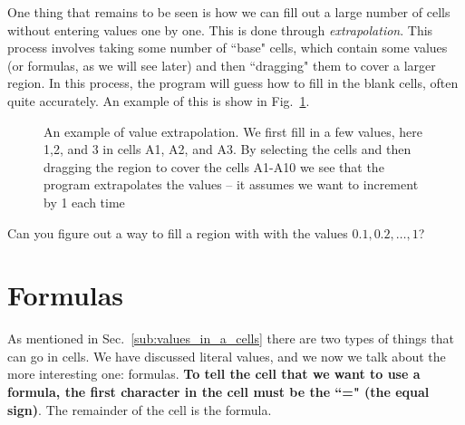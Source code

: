 \documentclass[10pt]{article}
\begin{document}
One thing that remains to be seen is how we can fill out a large number of cells without entering values one by one. This is done through \textit{extrapolation}. This process involves taking some number of ``base" cells, which contain some values (or formulas, as we will see later) and then ``dragging" them to cover a larger region. In this process, the program will guess how to fill in the blank cells, often quite accurately. An example of this is show in Fig.~\ref{fig:extrapolation}.


\begin{figure}[htpb]
	\centering
	\begin{minipage}{0.5\textwidth}
	\begin{sheetpic}
	\end{sheetpic}
	\end{minipage}
	\begin{minipage}{0.3\textwidth}
	\begin{sheetpic}
		\etab[10]{A-B}	
		\fillCol{A}{1}{10}{\row}{c}
		\multiSelec{A-1}{A-10}
	\end{sheetpic}
\end{minipage}
\caption{An example of value extrapolation. We first fill in a few values, here 1,2, and 3 in cells A1, A2, and A3. By selecting the cells and then dragging the region to cover the cells A1-A10 we see that the program extrapolates the values -- it assumes we want to increment by 1 each time}%
	\label{fig:extrapolation}
\end{figure}

\begin{exercise}
	Can you figure out a way to fill a region with with the values $0.1,0.2, \ldots, 1$?
\end{exercise}



\section{Formulas}%
\label{sec:formulas}

As mentioned in Sec.~\ref{sub:values_in_a_cells} there are two types of things that can go in cells. We have discussed literal values, and we now we talk about the more interesting one: formulas. \textbf{To tell the cell that we want to use a formula, the first character in the cell must be the ``=" (the equal sign)}. The remainder of the cell is the formula. 
\end{document}

